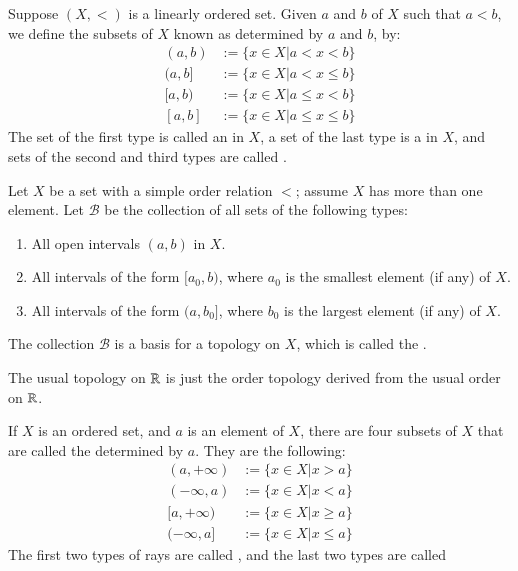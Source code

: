 \documentclass[12pt, a4paper, oneside, openright, titlepage]{book}
\begin{document}
\begin{defn}
    Suppose $(X,<)$ is a linearly ordered set. Given $a$ and $b$ of $X$ such that $a < b$, we define the subsets of $X$ known as  determined by $a$ and $b$, by: \begin{align*}
        (a,b) &:= \{x\in X\vert a < x < b\} \\
        (a,b] &:= \{x \in X\vert a < x \leq b\} \\
        [a,b) &:= \{x \in X\vert a\leq x < b\} \\
        [a,b] &:= \{x \in X\vert a \leq x \leq b\} 
    \end{align*}
    The set of the first type is called an  in $X$, a set of the last type is a  in $X$, and sets of the second and third types are called .
\end{defn}

\begin{defn}
    Let $X$ be a set with a simple order relation $<$; assume $X$ has more than one element. Let $\mathcal{B}$ be the collection of all sets of the following types: \begin{enumerate}
        \item All open intervals $(a,b)$ in $X$.
        \item All intervals of the form $[a_0,b)$, where $a_0$ is the smallest element (if any) of $X$.
        \item All intervals of the form $(a,b_0]$, where $b_0$ is the largest element (if any) of $X$.
    \end{enumerate}
    The collection $\mathcal{B}$ is a basis for a topology on $X$, which is called the .
\end{defn}

\begin{eg}
    The usual topology on $\mathbb R$ is just the order topology derived from the usual order on $\mathbb R$.
\end{eg}

\begin{defn}
    If $X$ is an ordered set, and $a$ is an element of $X$, there are four subsets of $X$ that are called the  determined by $a$. They are the following: \begin{align*}
        (a,+\infty) &:= \{x\in X\vert x > a\} \\
        (-\infty,a) &:= \{x \in X\vert x < a\} \\
        [a,+\infty) &:= \{x \in X\vert x\geq a\} \\
        (-\infty,a] &:= \{x \in X\vert x \leq a\} 
    \end{align*}
    The first two types of rays are called , and the last two types are called 
\end{defn}
\end{document}
